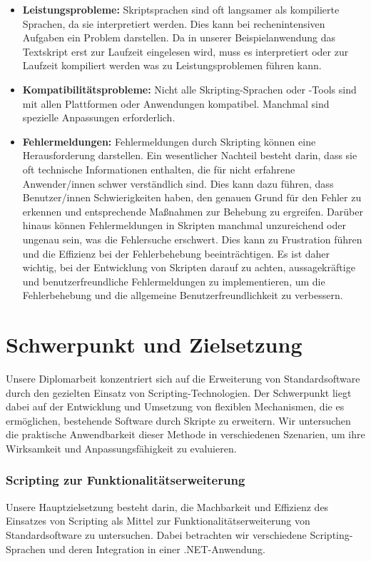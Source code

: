 \begin{itemize}
    \item \textbf{Leistungsprobleme:} Skriptsprachen sind oft langsamer als kompilierte Sprachen, 
    da sie interpretiert werden. Dies kann bei rechenintensiven Aufgaben ein Problem darstellen.
    Da in unserer Beispielanwendung das Textskript erst zur Laufzeit eingelesen wird, muss es interpretiert
    oder zur Laufzeit kompiliert werden was zu Leistungsproblemen führen kann.
    \item \textbf{Kompatibilitätsprobleme:} Nicht alle Skripting-Sprachen oder -Tools sind 
    mit allen Plattformen oder Anwendungen kompatibel. Manchmal sind spezielle 
    Anpassungen erforderlich.
    \item \textbf{Fehlermeldungen:} Fehlermeldungen durch Skripting können eine Herausforderung 
    darstellen. Ein wesentlicher Nachteil besteht darin, dass sie oft technische Informationen 
    enthalten, die für nicht erfahrene Anwender/innen schwer verständlich sind. 
    Dies kann dazu führen, dass Benutzer/innen Schwierigkeiten haben, den genauen Grund 
    für den Fehler zu erkennen und entsprechende Maßnahmen zur Behebung zu ergreifen. 
    Darüber hinaus können Fehlermeldungen in Skripten manchmal unzureichend oder ungenau sein, 
    was die Fehlersuche erschwert. Dies kann zu Frustration führen und die Effizienz 
    bei der Fehlerbehebung beeinträchtigen. Es ist daher wichtig, bei der Entwicklung 
    von Skripten darauf zu achten, aussagekräftige und benutzerfreundliche 
    Fehlermeldungen zu implementieren, um die Fehlerbehebung und die allgemeine 
    Benutzerfreundlichkeit zu verbessern.
\end{itemize}

\newpage

\section{Schwerpunkt und Zielsetzung}

Unsere Diplomarbeit konzentriert sich auf die Erweiterung von Standardsoftware durch den 
gezielten Einsatz von Scripting-Technologien. Der Schwerpunkt liegt dabei auf der Entwicklung 
und Umsetzung von flexiblen Mechanismen, die es ermöglichen, bestehende Software durch Skripte 
zu erweitern. Wir untersuchen die praktische Anwendbarkeit dieser Methode in verschiedenen Szenarien,
um ihre Wirksamkeit und Anpassungsfähigkeit zu evaluieren.

\subsubsection*{Scripting zur Funktionalitätserweiterung}
Unsere Hauptzielsetzung besteht darin, die Machbarkeit und Effizienz des Einsatzes von 
Scripting als Mittel zur Funktionalitätserweiterung von Standardsoftware zu untersuchen. 
Dabei betrachten wir verschiedene Scripting-Sprachen und deren Integration in einer .NET-Anwendung.

